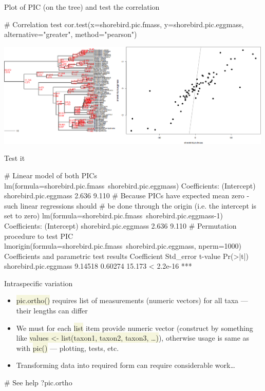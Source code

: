 \documentclass[compress, xelatex, 11pt, xcolor=svgnames, aspectratio=169,
	hyperref={
		bookmarks=true,
		unicode=true,
		colorlinks=true,
		pdftitle={Molecular data in R},
		plainpages=false,
		pdfauthor={Vojtech Zeisek},
		pdfsubject={Course about phylogeny and evolution in R},
		pdfcreator={XeLaTeX},
		pdfkeywords={R, evolution, phylogeny, molecular data},
		linkcolor=Crimson, %
		anchorcolor=Magenta, %
		citecolor=Magenta, %
		filecolor=Magenta, %
		menucolor=Magenta, %
		urlcolor=DodgerBlue, %
		},
	url={hyphens, lowtilde} %
	]{beamer}
\renewcommand{\texttt}[1]{\colorbox{Beige}{{\ttfamily #1}}}
\begin{document}
\begin{frame}[fragile]{Plot of PIC (on the tree) and test the correlation}
	\begin{spluscode}
    # Correlation test
    cor.test(x=shorebird.pic.fmass, y=shorebird.pic.eggmass,
      alternative="greater", method="pearson")
	\end{spluscode}
	\begin{center}
		\includegraphics[height=5cm]{pic.png}
	\end{center}
\end{frame}

\begin{frame}[fragile]{Test it}
	\label{pic-test}
	\begin{spluscode}
    # Linear model of both PICs
    lm(formula=shorebird.pic.fmass~shorebird.pic.eggmass)
    Coefficients:
          (Intercept)  shorebird.pic.eggmass
                2.636                  9.110
    # Because PICs have expected mean zero - such linear regressions should
    # be done through the origin (i.e. the intercept is set to zero)
    lm(formula=shorebird.pic.fmass~shorebird.pic.eggmass-1)
    Coefficients:
          (Intercept)  shorebird.pic.eggmass
                2.636                  9.110
    # Permutation procedure to test PIC
    lmorigin(formula=shorebird.pic.fmass~shorebird.pic.eggmass, nperm=1000)
    Coefficients and parametric test results 
                          Coefficient Std_error t-value  Pr(>|t|)
    shorebird.pic.eggmass     9.14518   0.60274  15.173 < 2.2e-16 ***
	\end{spluscode}
\end{frame}

\begin{frame}[fragile]{Intraspecific variation}
	\begin{itemize}
		\item \texttt{pic.ortho()} requires list of measurements (numeric vectors) for all taxa --- their lengths can differ
		\item We must for each \texttt{list} item provide numeric vector (construct by something like \texttt{values <- list(taxon1, taxon2, taxon3, \ldots)}), otherwise usage is same as with \texttt{pic()} --- plotting, tests, etc.
		\item Transforming data into required form can require considerable work\ldots
	\end{itemize}
	\begin{spluscode}
    # See help
    ?pic.ortho
	\end{spluscode}
\end{frame}
\end{document}
